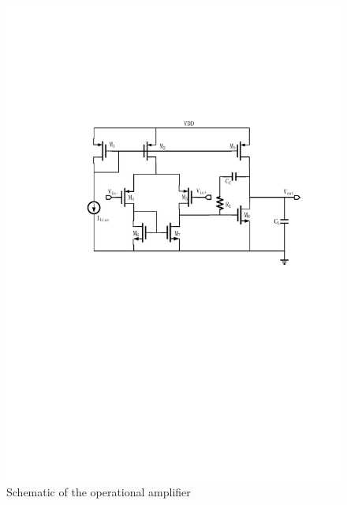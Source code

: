 \begin{figure}[h]
    \begin{center}
        \centerline{\includegraphics[width=\columnwidth]{./img/sopam.pdf}}
        \caption{Schematic of the operational amplifier}
        \label{fig:schDAC2014}
    \end{center}
    \vskip -0.2in
\end{figure}

